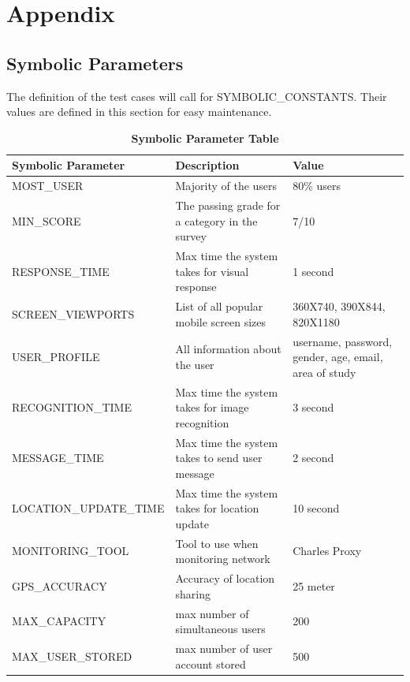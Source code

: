 \documentclass[12pt]{article}
\begin{document}
\newpage{}

\section{Appendix}
\subsection{Symbolic Parameters}
The definition of the test cases will call for SYMBOLIC\_CONSTANTS.
Their values are defined in this section for easy maintenance.

\begin{table}[H]
\caption{\bf Symbolic Parameter Table}
\begin{tabular}{|p{0.4\linewidth} | p{0.3\linewidth}| p{0.3\linewidth} |}
\hline
\multicolumn{1}{|l}{\bfseries Symbolic Parameter} & \multicolumn{1}{|l|}{\bfseries Description} & \multicolumn{1}{l|}{\bfseries Value}\\
\hline
MOST\_USER & Majority of the users & 80\% users \\
\hline
MIN\_SCORE & The passing grade for a category in the survey & 7/10\\
\hline
RESPONSE\_TIME & Max time the system takes for visual response & 1 second\\
\hline
SCREEN\_VIEWPORTS & List of all popular mobile screen sizes & 360X740, 390X844, 820X1180\\
\hline
USER\_PROFILE & All information about the user & username, password, gender, age, email, area of study\\
\hline
RECOGNITION\_TIME & Max time the system takes for image recognition & 3 second\\
\hline
MESSAGE\_TIME & Max time the system takes to send user message & 2 second\\
\hline
LOCATION\_UPDATE\_TIME & Max time the system takes for location update & 10 second\\
\hline
MONITORING\_TOOL & Tool to use when monitoring network & Charles Proxy\\
\hline
GPS\_ACCURACY & Accuracy of location sharing & 25 meter\\
\hline
MAX\_CAPACITY & max number of simultaneous users & 200\\
\hline
MAX\_USER\_STORED & max number of user account stored & 500\\
\hline
\end{tabular}
\end{table}
\end{document}
